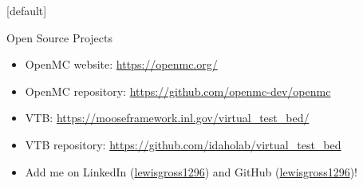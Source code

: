 \documentclass[9pt,t,aspectratio=169]{beamer}
\makeatletter
\newenvironment{withoutheadline}{
       \setbeamertemplate{headline}[default]
       \def\beamer@entrycode{\vspace*{-\headheight}}
    }{}
\makeatother
\begin{document}
\begin{withoutheadline}
    \LARGE
    \begin{frame}{Open Source Projects}
        \begin{itemize}
            \item OpenMC website: \href{https://openmc.org/}{https://openmc.org/}
            \item OpenMC repository: \href{https://github.com/openmc-dev/openmc}{https://github.com/openmc-dev/openmc}
            \item VTB: \href{https://mooseframework.inl.gov/virtual_test_bed/}{https://mooseframework.inl.gov/virtual\_test\_bed/}
            \item VTB repository: \href{https://github.com/idaholab/virtual_test_bed}{https://github.com/idaholab/virtual\_test\_bed}
            \item Add me on LinkedIn (\href{https://www.linkedin.com/in/lewisgross1296}{lewisgross1296}) and GitHub (\href{https://github.com/lewisgross1296}{lewisgross1296})!
        \end{itemize}
    \end{frame}
\end{withoutheadline}

\appendix
\end{document}
